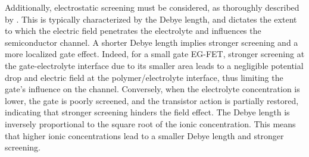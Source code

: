 Additionally, electrostatic screening must be considered, as thoroughly described by \citet{delavariNernst2021}. This is typically characterized by the Debye length, and dictates the extent to which the electric field penetrates the electrolyte and influences the semiconductor channel. A shorter Debye length implies stronger screening and a more localized gate effect. Indeed, for a small gate EG-FET, stronger screening at the gate-electrolyte interface due to its smaller area leads to a negligible potential drop and electric field at the polymer/electrolyte interface, thus limiting the gate's influence on the channel. Conversely, when the electrolyte concentration is lower, the gate is poorly screened, and the transistor action is partially restored, indicating that stronger screening hinders the field effect. The Debye length is inversely proportional to the square root of the ionic concentration. This means that higher ionic concentrations lead to a smaller Debye length and stronger screening. 

